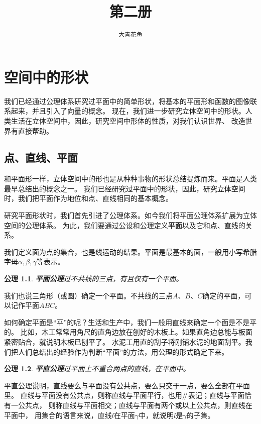 \documentclass[12pt,UTF8]{ctexbook}
\title{\zihao{0} \bfseries 第二册}
\author{\zihao{2} \texttt{大青花鱼}}
\date{}
\newtheorem{po}{公理}
\renewcommand\parallel{\mathrel{/\mskip-4mu/}}
\begin{document}
\maketitle
\tableofcontents
\newpage

\chapter{空间中的形状}

我们已经通过公理体系研究过平面中的简单形状，将基本的平面形和函数的图像联系起来，并且引入了向量的概念。
现在，我们进一步研究立体空间中的形状。人类生活在立体空间中，因此，研究空间中形体的性质，对我们认识世界、
改造世界有直接帮助。

\section{点、直线、平面}

和平面形一样，立体空间中的形也是从种种事物的形状总结提炼而来。平面是人类最早总结出的概念之一。
我们已经研究过平面中的形状，因此，研究立体空间时，我们把平面作为地位和点、直线相同的基本概念。

研究平面形状时，我们首先引进了公理体系。如今我们将平面公理体系扩展为立体空间的公理体系。
为此，我们要通过公设和公理定义\textbf{平面}以及它和点、直线的关系。

我们定义面为点的集合，也是线运动的结果。平面是最基本的面，一般用小写希腊字母$\alpha,\beta,\gamma$等表示。
\begin{po}{\textbf{平面公理}}\label{po:0}
    过不共线的三点，有且仅有一个平面。
\end{po}

我们也说三角形（或圆）确定一个平面。不共线的三点$A$、$B$、$C$确定的平面，可以记作平面$ABC$。

如何确定平面是“平”的呢？生活和生产中，我们一般用直线来确定一个面是不是平的。
比如，木工常常用角尺的直角边放在刨好的木板上。如果直角边总能与板面紧密贴合，就说明木板已刨平了。
水泥工用直的刮子将刚铺水泥的地面刮平。我们把人们总结出的经验作为判断“平面”的方法，用公理的形式确定下来。
\begin{po}{\textbf{平直公理}}\label{po:1}
    过平面上不重合两点的直线，在平面中。
\end{po}
平直公理说明，直线要么与平面没有公共点，要么只交于一点，要么全部在平面里。
直线与平面没有公共点，则称直线与平面平行，也用$\parallel$表记；直线与平面恰有一公共点，
则称直线与平面相交；直线与平面有两个或以上公共点，则直线在平面中，
用集合的语言来说，直线$l$在平面$\gamma$中，就说明$l$是$\gamma$的子集。
\end{document}
